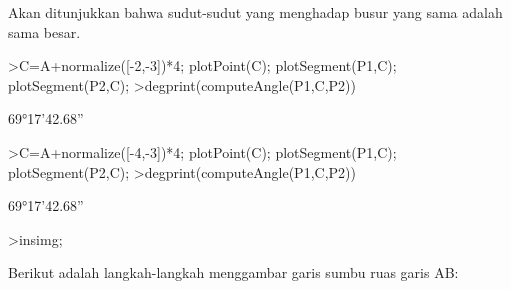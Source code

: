 \documentclass[a4paper,10pt]{article}
\begin{document}
\begin{eulernotebook}
\begin{eulercomment}
\begin{eulercomment}
\begin{eulercomment}
\begin{eulercomment}
\begin{eulercomment}
\begin{eulercomment}
\begin{eulercomment}
\begin{eulercomment}
\begin{eulercomment}
\begin{eulercomment}
\begin{eulercomment}
\begin{eulercomment}
\begin{eulercomment}
\begin{eulercomment}
\begin{eulercomment}
\begin{eulercomment}
\begin{eulercomment}
\begin{eulercomment}
\begin{eulercomment}
\begin{eulercomment}
\begin{eulercomment}
\begin{eulercomment}
\begin{eulercomment}
\begin{eulercomment}
\begin{eulercomment}
\begin{eulercomment}
\begin{eulercomment}
\begin{eulercomment}
\begin{eulercomment}
\begin{eulercomment}
\begin{eulercomment}
\begin{eulercomment}
\begin{eulercomment}
\begin{eulercomment}
\begin{eulercomment}
\begin{eulercomment}
\begin{eulercomment}
\begin{eulercomment}
\begin{euleroutput}
\end{euleroutput}
\begin{eulercomment}
Akan ditunjukkan bahwa sudut-sudut yang menghadap busur yang sama
adalah sama besar.
\end{eulercomment}
\begin{eulerprompt}
>C=A+normalize([-2,-3])*4; plotPoint(C); plotSegment(P1,C); plotSegment(P2,C);
>degprint(computeAngle(P1,C,P2))
\end{eulerprompt}
\begin{euleroutput}
  69°17'42.68''
\end{euleroutput}
\begin{eulerprompt}
>C=A+normalize([-4,-3])*4; plotPoint(C); plotSegment(P1,C); plotSegment(P2,C);
>degprint(computeAngle(P1,C,P2))
\end{eulerprompt}
\begin{euleroutput}
  69°17'42.68''
\end{euleroutput}
\begin{eulerprompt}
>insimg;
\end{eulerprompt}
\begin{eulercomment}
Berikut adalah langkah-langkah menggambar garis sumbu ruas garis AB:


\end{eulercomment}
\end{eulercomment}
\end{eulercomment}
\end{eulercomment}
\end{eulercomment}
\end{eulercomment}
\end{eulercomment}
\end{eulercomment}
\end{eulercomment}
\end{eulercomment}
\end{eulercomment}
\end{eulercomment}
\end{eulercomment}
\end{eulercomment}
\end{eulercomment}
\end{eulercomment}
\end{eulercomment}
\end{eulercomment}
\end{eulercomment}
\end{eulercomment}
\end{eulercomment}
\end{eulercomment}
\end{eulercomment}
\end{eulercomment}
\end{eulercomment}
\end{eulercomment}
\end{eulercomment}
\end{eulercomment}
\end{eulercomment}
\end{eulercomment}
\end{eulercomment}
\end{eulercomment}
\end{eulercomment}
\end{eulercomment}
\end{eulercomment}
\end{eulercomment}
\end{eulercomment}
\end{eulercomment}
\end{eulercomment}
\end{eulernotebook}
\end{document}
